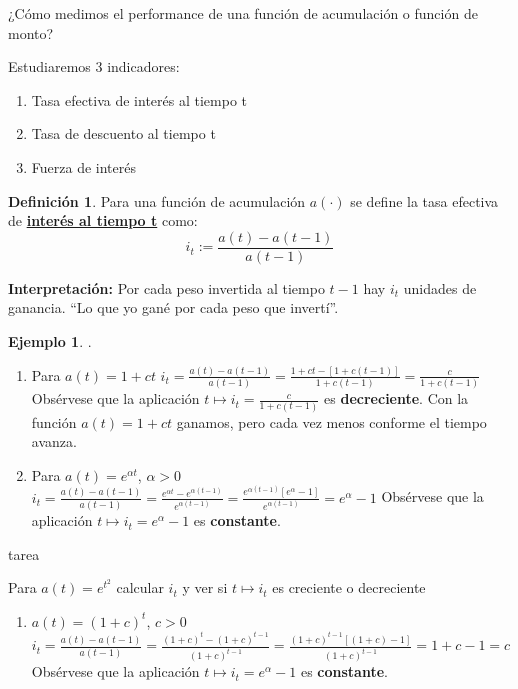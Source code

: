 \documentclass[
]{book}
\providecommand{\tightlist}{%
  \setlength{\itemsep}{0pt}\setlength{\parskip}{0pt}}
\theoremstyle{definition}
\newtheorem{definition}{Definición}[chapter]
\theoremstyle{definition}
\newtheorem{example}{Ejemplo}[chapter]
\theoremstyle{definition}
\theoremstyle{definition}
\theoremstyle{remark}
\begin{document}
¿Cómo medimos el performance de una función de acumulación o función de monto?

Estudiaremos 3 indicadores:

\begin{enumerate}
\def\labelenumi{\arabic{enumi}.}
\tightlist
\item
  Tasa efectiva de interés al tiempo t
\item
  Tasa de descuento al tiempo t
\item
  Fuerza de interés
\end{enumerate}

\begin{definition}
Para una función de acumulación \(a\left( \cdot \right)\) se define la tasa efectiva de \underline{\textbf{interés al tiempo t}} como:
\[ i_t := \frac{a\left( t \right) - a\left( t -1 \right)}{a\left( t - 1 \right)}\]
\end{definition}

\textbf{Interpretación:} Por cada peso invertida al tiempo \(t-1\) hay \(i_t\) unidades de ganancia. ``Lo que yo gané por cada peso que invertí''.

\begin{example}

.

\begin{enumerate}
\def\labelenumi{\arabic{enumi}.}
\item
  Para \(a(t) = 1 + ct\)
  \(i_t = \frac{a\left( t \right) - a\left( t -1 \right)}{a\left( t - 1 \right)} = \frac{1 + ct - \left[ 1 + c(t-1)\right] }{1+c(t-1)} = \frac{c}{1+c(t-1)}\)
  Obsérvese que la aplicación \(t \longmapsto i_t = \frac{c}{1+c(t-1)}\) es \textbf{decreciente}.
  Con la función \(a(t) = 1 + ct\) ganamos, pero cada vez menos conforme el tiempo avanza.
\item
  Para \(a(t) = e^{\alpha t}\), \(\alpha > 0\)
  \(i_t = \frac{a\left( t \right) - a\left( t -1 \right)}{a\left( t - 1 \right)} = \frac{e^{\alpha t} - e^{\alpha (t-1)}}{e^{\alpha (t-1)}} = \frac{e^{\alpha (t-1)}\left[ e^{\alpha}-1\right]}{e^{\alpha (t-1)}} = e^{\alpha} -1\)
  Obsérvese que la aplicación \(t \longmapsto i_t = e^{\alpha} -1\) es \textbf{constante}.
\end{enumerate}

{tarea}

Para \(a(t)= e^{t^2}\) calcular \(i_t\) y ver si \(t \longmapsto i_t\) es creciente o decreciente

\begin{enumerate}
\def\labelenumi{\arabic{enumi}.}
\setcounter{enumi}{2}
\tightlist
\item
  \(a(t) = (1+c)^t\), \(c > 0\)
  \(i_t = \frac{a\left( t \right) - a\left( t -1 \right)}{a\left( t - 1 \right)} = \frac{(1+c)^t - (1+c)^{t-1}}{(1+c)^{t-1}} = \frac{(1+c)^{t-1}[(1+c)-1]}{(1+c)^{t-1}} = 1+c-1 = c\)
  Obsérvese que la aplicación \(t \longmapsto i_t = e^{\alpha} -1\) es \textbf{constante}.
\end{enumerate}

\end{example}
\end{document}

